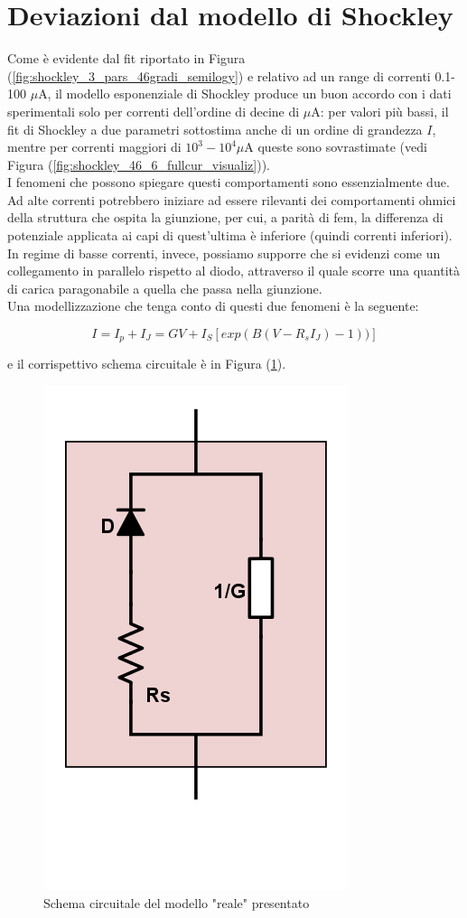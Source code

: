 \documentclass[a4paper]{article}
\begin{document}
\section{Deviazioni dal modello di Shockley}

Come è evidente dal fit riportato in Figura (\ref{fig:shockley_3_pars_46gradi_semilogy}) e relativo ad un range di correnti 0.1-100 $\mu$A, il modello esponenziale di Shockley produce un buon accordo con i dati sperimentali solo per correnti dell'ordine di decine di $\mu$A: per valori più bassi, il fit di Shockley a due parametri sottostima anche di un ordine di grandezza $I$, mentre per correnti maggiori di $10^3-10^4 \mu$A queste sono sovrastimate (vedi Figura (\ref{fig:shockley_46_6_fullcur_visualiz})).\\
I fenomeni che possono spiegare questi comportamenti sono essenzialmente due. Ad alte correnti potrebbero iniziare ad essere rilevanti dei comportamenti ohmici della struttura che ospita la giunzione, per cui, a parità di fem, la differenza di potenziale applicata ai capi di quest'ultima è inferiore (quindi correnti inferiori). In regime di basse correnti, invece, possiamo supporre che si evidenzi come un collegamento in parallelo rispetto al diodo, attraverso il quale scorre una quantità di carica paragonabile a quella che passa nella giunzione.\\

Una modellizzazione che tenga conto di questi due fenomeni è la seguente:

\begin{equation}\label{corrente_totale}
I = I_p + I_J = GV + I_S \left[exp(B(V-R_s I_J)-1))\right]
\end{equation}

e il corrispettivo schema circuitale è in Figura (\ref{fig:schema_circuit}).\\

\begin{figure}
\centering
\includegraphics[width=0.3\linewidth]{./schema_circuit}
\caption{Schema circuitale del modello "reale" presentato}
\label{fig:schema_circuit}
\end{figure}
\end{document}
